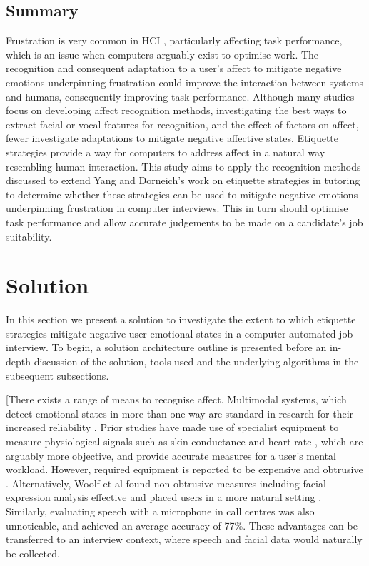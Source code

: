 \documentclass[12pt,a4paper]{article}
\begin{document}
\subsection{Summary}
Frustration is very common in HCI \cite{ceaparu2004determining}, particularly affecting task performance, which is an issue when computers arguably exist to optimise work. The recognition and consequent adaptation to a user's affect to mitigate negative emotions underpinning frustration could improve the interaction between systems and humans, consequently improving task performance. Although many studies focus on developing affect recognition methods, investigating the best ways to extract facial or vocal features for recognition, and the effect of factors on affect, fewer investigate adaptations to mitigate negative affective states. Etiquette strategies provide a way for computers to address affect in a natural way resembling human interaction. This study aims to apply the recognition methods discussed to extend Yang and Dorneich's work on etiquette strategies in tutoring \cite{yang2018evaluating} to determine whether these strategies can be used to mitigate negative emotions underpinning frustration in computer interviews. This in turn should optimise task performance and allow accurate judgements to be made on a candidate's job suitability.


\section{Solution}
In this section we present a solution to investigate the extent to which etiquette strategies mitigate negative user emotional states in a computer-automated job interview. To begin, a solution architecture outline is presented before an in-depth discussion of the solution, tools used and the underlying algorithms in the subsequent subsections.

[There exists a range of means to recognise affect. Multimodal systems, which detect emotional states in more than one way are standard in research for their increased reliability \cite{jaimes2007multimodal}. Prior studies have made use of specialist equipment to measure physiological signals such as skin conductance and heart rate \cite{pantic2003toward}, which are arguably more objective, and provide accurate measures for a user's mental workload. However, required equipment is reported to be expensive and obtrusive \cite{tao2019systematic}. Alternatively, Woolf et al found non-obtrusive measures including facial expression analysis effective and placed users in a more natural setting \cite{woolf2009affect}. Similarly, evaluating speech with a microphone in call centres was also unnoticable, and achieved an average accuracy of 77\%. These advantages can be transferred to an interview context, where speech and facial data would naturally be collected.]
\end{document}
